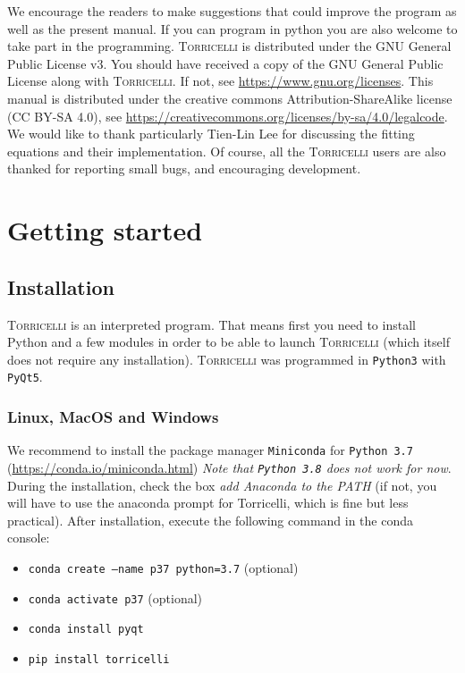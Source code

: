 \documentclass[oldfontcommands,openany,oneside]{memoir}
\begin{document}
We encourage the readers to make suggestions that could improve the program as well as the present manual. If you can program in python you are also welcome to take part in the programming. \textsc{Torricelli} is distributed under the GNU General Public License v3. You should have received a copy of the GNU General Public License along with \textsc{Torricelli}.  If not, see \url{https://www.gnu.org/licenses}. This manual is distributed under the creative commons Attribution-ShareAlike license (CC BY-SA 4.0), see \url{https://creativecommons.org/licenses/by-sa/4.0/legalcode}.\\

We would like to thank particularly Tien-Lin Lee for discussing the fitting equations and their implementation. Of course, all the \textsc{Torricelli} users are also thanked for reporting small bugs, and encouraging development. \newpage

\tableofcontents
\mainmatter

\chapter{Getting started}
\section{Installation} %
\textsc{Torricelli} is an interpreted program. That means first you need to install Python and a few modules in order to be able to launch \textsc{Torricelli} (which itself does not require any installation). \textsc{Torricelli} was programmed in \texttt{Python3} with \texttt{PyQt5}. 

\subsection{Linux, MacOS and Windows}
We recommend to install the package manager \verb+Miniconda+  for \verb+Python 3.7+ (\href{https://conda.io/miniconda.html}{https://conda.io/miniconda.html}) \emph{Note that \texttt{Python 3.8} does not work for now}. During the installation, check the box \emph{add Anaconda to the PATH} (if not, you will have to use the anaconda prompt for Torricelli, which is fine but less practical). After installation, execute the following command in the conda console:
\begin{itemize}
\item \texttt{conda create --name p37 python=3.7} (optional)
\item \texttt{conda activate p37} (optional)
\item \texttt{conda install pyqt }
\item \texttt{pip install torricelli}
\end{itemize}
\end{document}
